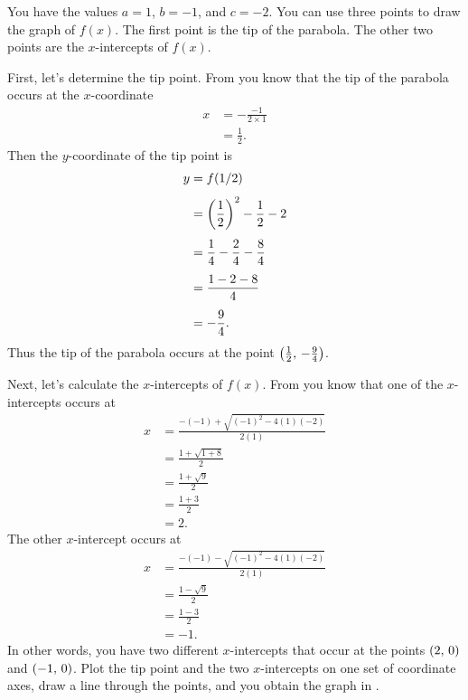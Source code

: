 \documentclass[a4paper,oneside,12pt]{article}
\begin{document}
\begin{solution}
You have the values $a = 1$, $b = -1$, and $c = -2$.  You can use
three points to draw the graph of $f(x)$.  The first point is the tip
of the parabola.  The other two points are the $x$-intercepts of
$f(x)$.

First, let's determine the tip point.  From
 you know that the tip of the
parabola occurs at the $x$-coordinate
\begin{align*}
x
&=
-\frac{-1}{2 \times 1} \\[4pt]
&=
\frac{1}{2}.
\end{align*}
Then the $y$-coordinate of the tip point is
\begin{align*}
y
&=
f(1/2) \\[4pt]
&=
\parenthesis*{\frac{1}{2}}^2 - \frac{1}{2} - 2 \\[4pt]
&=
\frac{1}{4} - \frac{2}{4} - \frac{8}{4} \\[4pt]
&=
\frac{1 - 2 - 8}{4} \\[4pt]
&=
-\frac{9}{4}.
\end{align*}
Thus the tip of the parabola occurs at the point
$\tuple{\frac{1}{2}}{-\frac{9}{4}}$.

Next, let's calculate the $x$-intercepts of $f(x)$.  From
 you know that one of the
$x$-intercepts occurs at
\begin{align*}
x
&=
\frac{
  -(-1) + \sqrt{(-1)^2 - 4(1)(-2)}
}{
  2(1)
} \\[4pt]
&=
\frac{
  1 + \sqrt{1 + 8}
}{
  2
} \\[4pt]
&=
\frac{
  1 + \sqrt{9}
}{
  2
} \\[4pt]
&=
\frac{
  1 + 3
}{
  2
} \\[4pt]
&=
2.
\end{align*}
The other $x$-intercept occurs at
\begin{align*}
x
&=
\frac{
  -(-1) - \sqrt{(-1)^2 - 4(1)(-2)}
}{
  2(1)
} \\[4pt]
&=
\frac{
  1 - \sqrt{9}
}{
  2
} \\[4pt]
&=
\frac{
  1 - 3
}{
  2
} \\[4pt]
&=
-1.
\end{align*}
In other words, you have two different $x$-intercepts that occur at
the points $\tuple{2}{0}$ and $\tuple{-1}{0}$.  Plot the tip point and
the two $x$-intercepts on one set of coordinate axes, draw a line
through the points, and you obtain the graph in
.
\end{solution}
\end{document}
